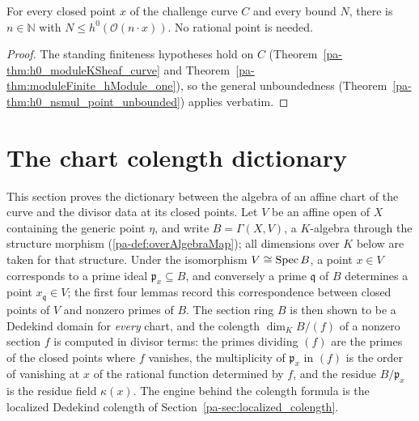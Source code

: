 \begin{theorem}
  \label{pa-thm:h0_nsmul_point_unbounded_curve}
  \leanok

  For every closed point \(x\) of the challenge curve \(C\) and every bound \(N\), there is
  \(n \in \mathbb N\) with \(N \le h^0(\mathcal O(n \cdot x))\). No rational point is needed.
\end{theorem}
\begin{proof}
  \leanok
  The standing finiteness hypotheses hold on \(C\) (Theorem~\ref{pa-thm:h0_moduleKSheaf_curve} and
  Theorem~\ref{pa-thm:moduleFinite_hModule_one}), so the general unboundedness
  (Theorem~\ref{pa-thm:h0_nsmul_point_unbounded}) applies verbatim.
\end{proof}

\section{The chart colength dictionary}
\label{pa-sec:chart_colength}

This section proves the dictionary between the algebra of an affine chart of the curve and
the divisor data at its closed points. Let \(V\) be an affine open of \(X\) containing the
generic point \(\eta\), and write \(B = \Gamma(X, V)\), a \(K\)-algebra through the
structure morphism (\ref{pa-def:overAlgebraMap}); all dimensions over \(K\) below are taken
for that structure. Under the isomorphism \(V \cong \operatorname{Spec} B\), a point \(x \in V\)
corresponds to a prime ideal \(\mathfrak p_x \subseteq B\), and conversely a prime
\(\mathfrak q\) of \(B\) determines a point \(x_{\mathfrak q} \in V\); the first four
lemmas record this correspondence between closed points of \(V\) and nonzero primes of
\(B\). The section ring \(B\) is then shown to be a Dedekind domain for \emph{every}
chart, and the colength \(\dim_K B/(f)\) of a nonzero section \(f\) is computed in
divisor terms: the primes dividing \((f)\) are the primes of the closed points where
\(f\) vanishes, the multiplicity of \(\mathfrak p_x\) in \((f)\) is the order of
vanishing at \(x\) of the rational function determined by \(f\), and the residue
\(B/\mathfrak p_x\) is the residue field \(\kappa(x)\). The engine behind the colength
formula is the localized Dedekind colength of
Section~\ref{pa-sec:localized_colength}.

